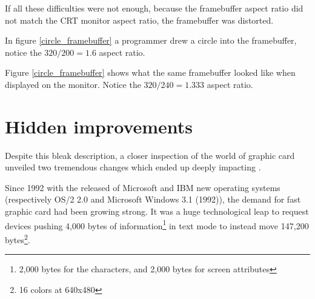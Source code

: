 \par
{} \label{vga_ratio}
\par
If all these difficulties were not enough, because the framebuffer aspect ratio did not match the CRT monitor aspect ratio, the framebuffer was distorted.\\
\par
{}
\par
In figure \ref{circle_framebuffer} a programmer drew a circle into the framebuffer, notice the $ 320/200 = 1.6 $ aspect ratio.
\par
{}
\par
Figure \ref{circle_framebuffer} shows what the same framebuffer looked like when displayed on the monitor. Notice the $ 320/240 = 1.333 $ aspect ratio.\\







\section{Hidden improvements}
Despite this bleak description, a closer inspection of the world of graphic card unveiled two tremendous changes which ended up deeply impacting \doom. \\
\par
Since 1992 with the released of Microsoft and IBM new operating systems (respectively OS/2 2.0 and Microsoft Windows 3.1 (1992)), the demand for fast graphic card had been growing strong. It was a huge technological leap to request devices pushing 4,000 bytes of information\footnote{2,000 bytes for the characters, and 2,000 bytes for screen attributes} in text mode to instead move 147,200 bytes\footnote{16 colors at 640x480}.\\
\par




